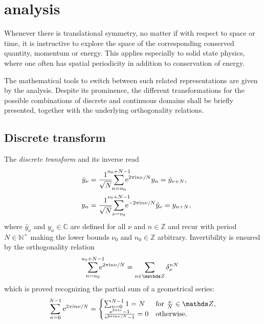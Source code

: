 
\chapter{ analysis}
\label{Fourier analysis}

Whenever there is translational symmetry, no matter if with respect to space or
time, it is instructive to explore the space of the corresponding conserved
quantity, momentum or energy. This applies especially to solid state physics,
where one often has spatial periodicity in addition to conservation of energy.

The mathematical tools to switch between such related representations are given
by the  analysis. Despite its prominence, the different
transformations for the possible combinations of discrete and continuous domains
shall be briefly presented, together with the underlying orthogonality
relations.

\section{Discrete  transform}

The \emph{discrete  transform} and its inverse read
%
\begin{align*}
    \hat y_\nu &= \frac 1 {\sqrt N}
    \smashoperator{\sum_{n = n_0}^{n_0 + N - 1}}
    \E^{2 \pi \I n \nu / N} y_n = \hat y_{\nu + N},
    \\
    \quad y_n &= \frac 1 {\sqrt N}
    \smashoperator{\sum_{\nu = \nu_0}^{\nu_0 + N - 1}}
    \E^{-2 \pi \I n \nu / N} \hat y_\nu = y_{n + N},
\end{align*}
%
where $\hat y_\nu$ and $y_n \in \mathds C$ are defined for all $\nu$ and $n \in
\mathds Z$ and recur with period $N \in \mathds N^+$ making the lower bounds
$\nu_0$ and $n_0 \in \mathds Z$ arbitrary. Invertibility is ensured by the
orthogonality relation
%
\begin{equation} \label{DFT orthogonality relation}
    \smashoperator{\sum_{n = n_0}^{n_0 + N - 1}} \E^{2 \pi \I n \nu / N} =
    \sum_{n \in \mathds Z} \delta_\nu^{n N}
\end{equation}
%
which is proved recognizing the partial sum of a geometrical series:
%
\begin{equation*}
    \sum_{n = 0}^{N - 1} \E^{2 \pi \I n \nu / N} =
    \begin{cases}
        \sum_{n = 0}^{N - 1} 1 = N
            & \text{for $\frac \nu N \in \mathds Z$,} \\
        \frac{\E^{2 \pi \I \nu} - 1}{\E^{2 \pi \I n \nu / N} - 1} = 0
            & \text{otherwise.}
    \end{cases}
\end{equation*}

